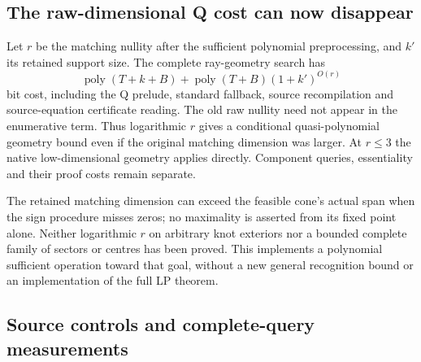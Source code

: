 \subsection{The raw-dimensional Q cost can now disappear}

Let $r$ be the matching nullity after the sufficient polynomial preprocessing,
and $k'$ its retained support size. The complete ray-geometry search has
\[
 \operatorname{poly}(T+k+B)+
                    \operatorname{poly}(T+B)(1+k')^{O(r)}
\]
bit cost, including the Q prelude, standard fallback, source recompilation
and source-equation certificate reading. The old raw nullity need not
appear in the enumerative term. Thus logarithmic $r$ gives a conditional
quasi-polynomial geometry bound even if the original matching dimension
was larger. At $r\le3$ the native low-dimensional geometry applies directly.
Component queries, essentiality and their proof costs remain separate.

The retained matching dimension can exceed the feasible cone's actual span
when the sign procedure misses zeros; no maximality is asserted from its
fixed point alone. Neither logarithmic $r$ on arbitrary knot exteriors nor
a bounded complete family of sectors or centres has been proved. This
implements a polynomial sufficient operation toward that goal, without a
new general recognition bound or an implementation of the full LP theorem.

\subsection{Source controls and complete-query measurements}

